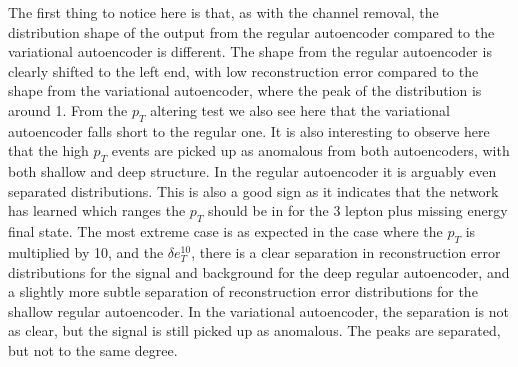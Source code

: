 The first thing to notice here is that, as with the channel removal, the distribution shape of the output from the regular autoencoder compared to the
variational autoencoder is different. The shape from the regular autoencoder is clearly shifted to the left end, with low reconstruction error compared 
to the shape from the variational autoencoder, where the peak of the distribution is around 1. From the $p_T$ altering test we also see here that the 
variational autoencoder falls short to the regular one. It is also interesting to observe here that the high $p_T$ events are picked up as anomalous from both
autoencoders, with both shallow and deep structure. In the regular autoencoder it is arguably even separated distributions. This is also a good sign as it 
indicates that the network has learned which ranges the $p_T$ should be in for the 3 lepton plus missing energy final state. The most extreme case is 
as expected in the case where the $p_T$ is multiplied by 10, and the $\delta e_T^{10}$, there is a clear separation in reconstruction error distributions for the
signal and background for the deep regular autoencoder, and a slightly more subtle separation of reconstruction error distributions for the shallow regular autoencoder.
In the variational autoencoder, the separation is not as clear, but the signal is still picked up as anomalous. The peaks are separated, but not to the same degree. 

\newpage